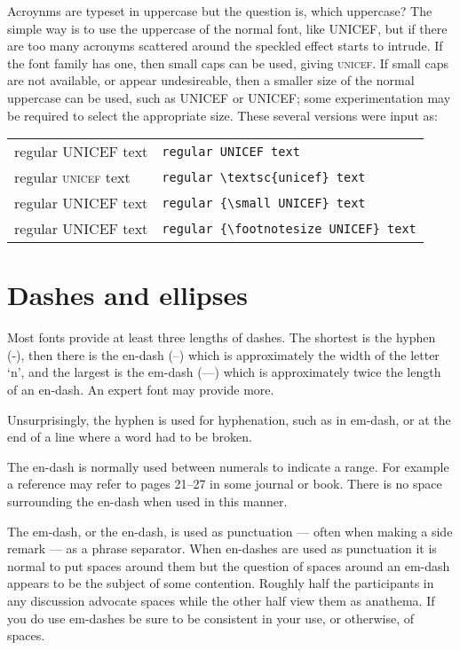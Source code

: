 \documentclass[10pt,letterpaper,extrafontsizes]{memoir}
\begin{document}
    Acroynms are typeset in uppercase but the 
question is, which uppercase?
The simple way is to use the uppercase of the normal font, like UNICEF, but
if there are too many acronyms scattered around the speckled effect starts
to intrude. If the font family has one, then small caps can be used,
giving \textsc{unicef}. If small caps are not available, or appear
undesireable, then a smaller size of the normal uppercase can be used,
such as {\small UNICEF} or {\footnotesize UNICEF}; some experimentation
may be required to select the appropriate size. These several versions
were input as:\par
\begin{tabular}{ll}
regular UNICEF text & \verb?regular UNICEF text? \\
regular \textsc{unicef} text & \verb?regular \textsc{unicef} text? \\
regular {\small UNICEF} text & \verb?regular {\small UNICEF} text? \\
regular {\footnotesize UNICEF} text & \verb?regular {\footnotesize UNICEF} text? 
\end{tabular}


\section{Dashes and ellipses}

    Most fonts provide at least three lengths of dashes. The shortest is
the hyphen (-), then there is the en-dash (--) which is approximately the
width of the letter `n', and the largest is the em-dash (---) which is
approximately twice the length of an en-dash. An expert font may provide
more.

   Unsurprisingly, the hyphen 
is used for hyphenation, such as in em-dash, or
at the end of a line where a word had to be broken.

    The en-dash 
is normally used between numerals to indicate a range. For
example a reference may refer to pages 21--27 in some journal or book. There
is no space surrounding the en-dash when used in this manner.

    The em-dash, 
or the en-dash, is used as punctuation --- often when making a side 
remark --- as a phrase separator.
 When en-dashes are used as punctuation it is normal to put spaces around them
but the question of spaces around an em-dash appears to be the subject of
some contention. Roughly half the participants in any discussion advocate
spaces while the other half view them as anathema. If you do use em-dashes
be sure to be consistent in your use, or otherwise, of spaces.
\end{document}
